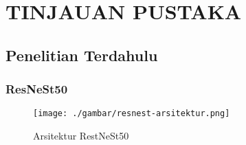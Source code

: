 \chapter{TINJAUAN PUSTAKA}


\section{Penelitian Terdahulu}
\lipsum[2-4]


\subsection{ResNeSt50}
\lipsum[2-4]

\begin{figure}[H]
  \centering
  \texttt{[image: ./gambar/resnest-arsitektur.png]}
  \caption{Arsitektur RestNeSt50}
  \label{fig:IoUequation}
\end{figure}



\newpage